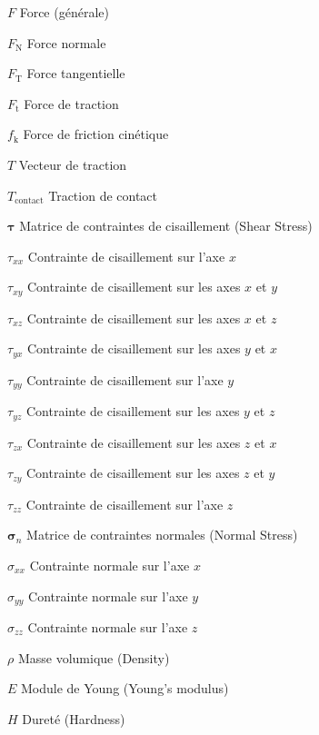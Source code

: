 \begin{listofsymbols}[3cm]
    \item [$F$] Force (générale)
    \item [$F_{\text{N}}$] Force normale
    \item [$F_{\text{T}}$] Force tangentielle
    \item [$F_{\text{t}}$] Force de traction
    \item [$f_{\text{k}}$] Force de friction cinétique
    \item [$T$] Vecteur de traction
    \item [$T_{\text{contact}}$] Traction de contact
    \item [$\boldsymbol{\tau}$] Matrice de contraintes de cisaillement (Shear Stress)
    \item [$\tau_{xx}$] Contrainte de cisaillement sur l'axe \(x\)
    \item [$\tau_{xy}$] Contrainte de cisaillement sur les axes \(x\) et \(y\)
    \item [$\tau_{xz}$] Contrainte de cisaillement sur les axes \(x\) et \(z\)
    \item [$\tau_{yx}$] Contrainte de cisaillement sur les axes \(y\) et \(x\)
    \item [$\tau_{yy}$] Contrainte de cisaillement sur l'axe \(y\)
    \item [$\tau_{yz}$] Contrainte de cisaillement sur les axes \(y\) et \(z\)
    \item [$\tau_{zx}$] Contrainte de cisaillement sur les axes \(z\) et \(x\)
    \item [$\tau_{zy}$] Contrainte de cisaillement sur les axes \(z\) et \(y\)
    \item [$\tau_{zz}$] Contrainte de cisaillement sur l'axe \(z\)
    \item [$\boldsymbol{\sigma}_n$] Matrice de contraintes normales (Normal Stress)
    \item [$\sigma_{xx}$] Contrainte normale sur l'axe \(x\)
    \item [$\sigma_{yy}$] Contrainte normale sur l'axe \(y\)
    \item [$\sigma_{zz}$] Contrainte normale sur l'axe \(z\)

    \item [$\rho$] Masse volumique (Density)
    \item [$E$] Module de Young (Young’s modulus)
    \item [$H$] Dureté (Hardness)


\end{listofsymbols}
